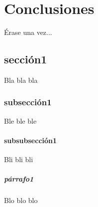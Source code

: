 	\chapter{Conclusiones}\label{cap.conclusiones}
	
	Érase una vez...
	\section{sección1}
	Bla bla bla
	\subsection{subsección1}
	Ble ble ble
	\subsubsection{subsubsección1}
	Bli bli bli
	\paragraph{párrafo1}
	Blo blo blo



	\newpage
	$\ $